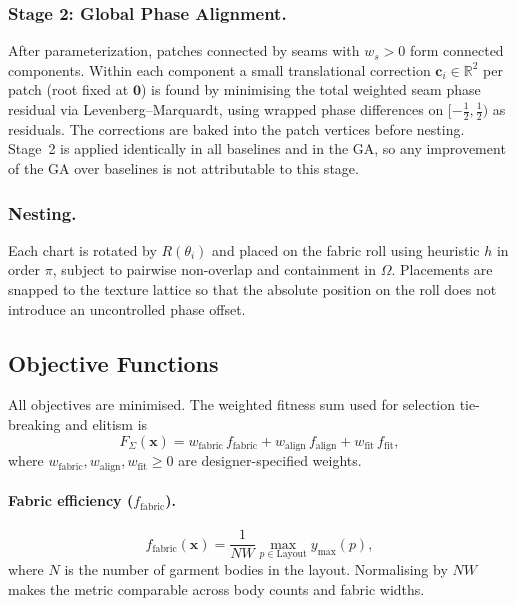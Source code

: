 \subsubsection{Stage 2: Global Phase Alignment.}
\label{sec:stage2}
After parameterization, patches connected by seams with $w_s > 0$ form
connected components.
Within each component a small translational correction $\mathbf{c}_i \in \mathbb{R}^2$
per patch (root fixed at $\mathbf{0}$) is found by minimising the total
weighted seam phase residual via Levenberg--Marquardt, using wrapped
phase differences on $[-\tfrac{1}{2},\tfrac{1}{2})$ as residuals.
The corrections are baked into the patch vertices before nesting.
Stage~2 is applied identically in all baselines and in the GA, so any
improvement of the GA over baselines is not attributable to this stage.

\subsubsection{Nesting.}
Each chart is rotated by $R(\theta_i)$ and placed on the fabric roll using
heuristic $h$ in order $\pi$, subject to pairwise non-overlap and
containment in $\Omega$.
Placements are snapped to the texture lattice so that the absolute position
on the roll does not introduce an uncontrolled phase offset.

\subsection{Objective Functions}
\label{sec:objectives}

All objectives are minimised.
The weighted fitness sum used for selection tie-breaking and elitism is
\[
F_\Sigma(\mathbf{x}) = w_\text{fabric}\, f_\text{fabric}
                     + w_\text{align}\, f_\text{align}
                     + w_\text{fit}\, f_\text{fit},
\]
where $w_\text{fabric}, w_\text{align}, w_\text{fit} \geq 0$ are
designer-specified weights.

\paragraph{Fabric efficiency ($f_\text{fabric}$).}
\[
f_\text{fabric}(\mathbf{x}) = \frac{1}{NW} \max_{p \in \text{Layout}} y_{\max}(p),
\]
where $N$ is the number of garment bodies in the layout.
Normalising by $NW$ makes the metric comparable across body counts and
fabric widths.

